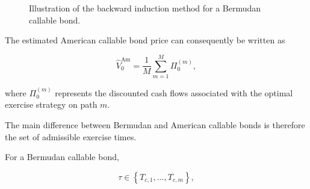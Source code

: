 \documentclass{article}
\begin{document}
\begin{figure}[H]

\caption{Illustration of the backward induction method for a Bermudan callable bond.}
\label{fig:backward_induction}
\end{figure}

The estimated American callable bond price can consequently be
written as

\begin{equation}
    \widehat{V}_0^{\mathrm{Am}}
    =
    \frac{1}{M}
    \sum_{m=1}^{M}
    \Pi_0^{(m)},
\end{equation}

where $\Pi_0^{(m)}$ represents the discounted cash flows associated
with the optimal exercise strategy on path $m$.



The main difference between Bermudan and American callable bonds is
therefore the set of admissible exercise times.

For a Bermudan callable bond,

\begin{equation}
    \tau
    \in
    \left\{
        T_{c,1},
        \ldots,
        T_{c,m}
    \right\},
\end{equation}
\end{document}
